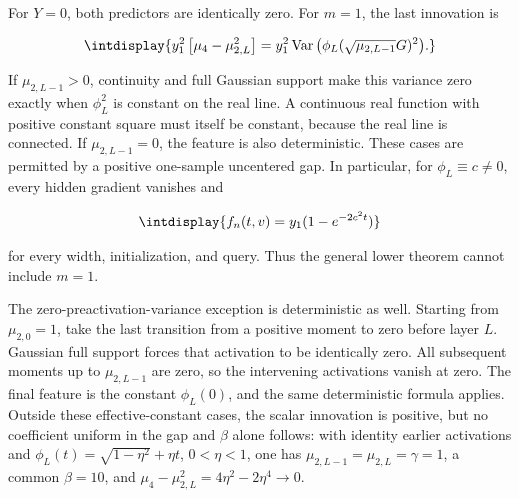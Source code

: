 
For \(Y=0\), both predictors are identically zero. For \(m=1\), the last innovation is


\begingroup\renewcommand{\theHequation}{intdisplay.506}
\begin{equation*}
\intdisplay{
y_1^2\left[\mu_4-\mu_{2,L}^2\right]
=y_1^2\operatorname{Var}
\big(\phi_L(\sqrt{\mu_{2,L-1}}G)^2\big).
}
\end{equation*}
\endgroup


If \(\mu_{2,\allowbreak L-1}>0\), continuity and full Gaussian support make this variance zero exactly when \(\phi_L^2\) is constant on the real line. A continuous real function with positive constant square must itself be constant, because the real line is connected. If \(\mu_{2,\allowbreak L-1}=0\), the feature is also deterministic. These cases are permitted by a positive one-sample uncentered gap. In particular, for \(\phi_L\equiv c\ne0\), every hidden gradient vanishes and


\begingroup\renewcommand{\theHequation}{intdisplay.507}
\begin{equation*}
\intdisplay{
f_n(t,v)=y_1(1-e^{-2c^2t})
}
\end{equation*}
\endgroup


for every width, initialization, and query. Thus the general lower theorem cannot include \(m=1\).



The zero-preactivation-variance exception is deterministic as well. Starting from \(\mu_{2,\allowbreak 0}=1\), take the last transition from a positive moment to zero before layer \(L\). Gaussian full support forces that activation to be identically zero. All subsequent moments up to \(\mu_{2,\allowbreak L-1}\) are zero, so the intervening activations vanish at zero. The final feature is the constant \(\phi_L(0)\), and the same deterministic formula applies. Outside these effective-constant cases, the scalar innovation is positive, but no coefficient uniform in the gap and \(\beta\) alone follows: with identity earlier activations and \(\phi_L(t)=\sqrt{1-\eta^2}+\eta t\), \(0<\eta<1\), one has \(\mu_{2,\allowbreak L-1}=\mu_{2,\allowbreak L}=\gamma=1\), a common \(\beta=10\), and \(\mu_4-\mu_{2,\allowbreak L}^2=4\eta^2-2\eta^4\to0\).



